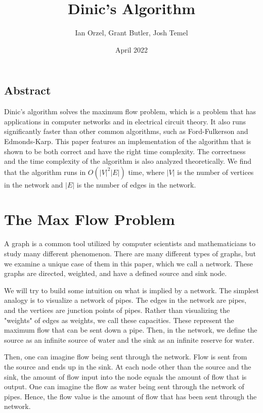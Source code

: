 \documentclass{report}
\title{Dinic's Algorithm}
\author{Ian Orzel, Grant Butler, Josh Temel}
\date{April 2022}
\begin{document}
\maketitle

\tableofcontents

\section{Abstract}
Dinic's algorithm solves the maximum flow problem, which is a problem that has applications in computer networks and in electrical circuit theory. It also runs significantly faster than other common algorithms, such as Ford-Fulkerson and Edmonds-Karp. This paper features an implementation of the algorithm that is shown to be both correct and have the right time complexity. The correctness and the time complexity of the algorithm is also analyzed theoretically. We find that the algorithm runs in $O(|V|^2|E|)$ time, where $|V|$ is the number of vertices in the network and $|E|$ is the number of edges in the network.

\chapter{The Max Flow Problem}
A graph is a common tool utilized by computer scientists and mathematicians to study many different phenomenon. There are many different types of graphs, but we examine a unique case of them in this paper, which we call a network. These graphs are directed, weighted, and have a defined source and sink node.

We will try to build some intuition on what is implied by a network. The simplest analogy is to visualize a network of pipes. The edges in the network are pipes, and the vertices are junction points of pipes. Rather than visualizing the "weights" of edges as weights, we call these capacities. These represent the maximum flow that can be sent down a pipe. Then, in the network, we define the source as an infinite source of water and the sink as an infinite reserve for water.

Then, one can imagine flow being sent through the network. Flow is sent from the source and ends up in the sink. At each node other than the source and the sink, the amount of flow input into the node equals the amount of flow that is output. One can imagine the flow as water being sent through the network of pipes. Hence, the flow value is the amount of flow that has been sent through the network.
\end{document}
